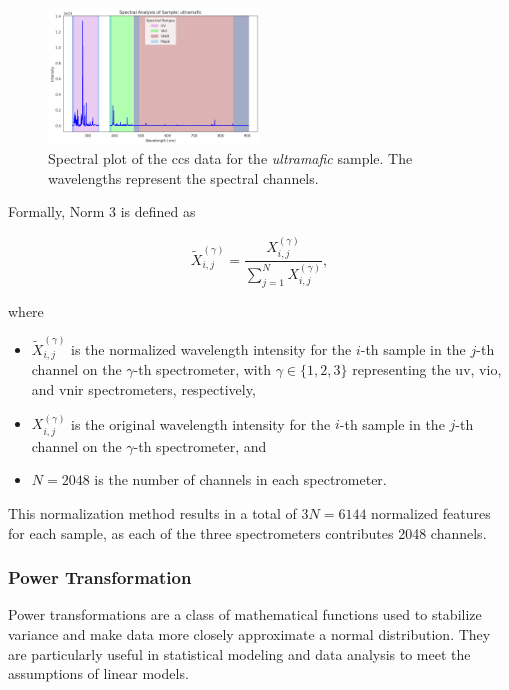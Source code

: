 \begin{figure}[H]
	\centering
	\includegraphics[width=0.5\textwidth]{images/spectral_plot.png}
	\caption{Spectral plot of the \gls{ccs} data for the \textit{ultramafic} sample. The wavelengths represent the spectral channels.}
	\label{fig:spectral_plot}
\end{figure}

Formally, Norm 3 is defined as

\begin{equation}
	\tilde{X}_{i,j}^{(\gamma)} = \frac{X_{i,j}^{(\gamma)}}{\sum_{j=1}^{N} X_{i,j}^{(\gamma)}},
\end{equation}

where

\begin{itemize}
	\item $\tilde{X}_{i,j}^{(\gamma)}$ is the normalized wavelength intensity for the $i$-th sample in the $j$-th channel on the $\gamma$-th spectrometer, with $\gamma \in \{1, 2, 3\}$ representing the \gls{uv}, \gls{vio}, and \gls{vnir} spectrometers, respectively,
	\item $X_{i,j}^{(\gamma)}$ is the original wavelength intensity for the $i$-th sample in the $j$-th channel on the $\gamma$-th spectrometer, and
	\item $N = 2048$ is the number of channels in each spectrometer.
\end{itemize}

This normalization method results in a total of $3N = 6144$ normalized features for each sample, as each of the three spectrometers contributes 2048 channels.

\subsubsection{Power Transformation}
Power transformations are a class of mathematical functions used to stabilize variance and make data more closely approximate a normal distribution.
They are particularly useful in statistical modeling and data analysis to meet the assumptions of linear models.


